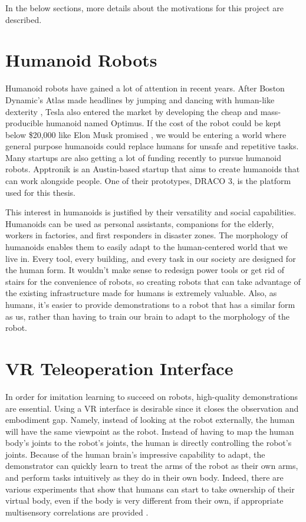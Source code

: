 In the below sections, more details about the motivations for this project are described.

\section{Humanoid Robots}
Humanoid robots have gained a lot of attention in recent years. After Boston Dynamic's Atlas made headlines by jumping and dancing with human-like dexterity \cite{atlas}, Tesla also entered the market by developing the cheap and mass-producible humanoid named Optimus. If the cost of the robot could be kept below \$20,000 like Elon Musk promised \cite{teslabot}, we would be entering a world where general purpose humanoids could replace humans for unsafe and repetitive tasks. Many startups are also getting a lot of funding recently to pursue humanoid robots. Apptronik is an Austin-based startup that aims to create humanoids that can work alongside people. One of their prototypes, DRACO 3, is the platform used for this thesis.

This interest in humanoids is justified by their versatility and social capabilities. Humanoids can be used as personal assistants, companions for the elderly, workers in factories, and first responders in disaster zones. The morphology of humanoids enables them to easily adapt to the human-centered world that we live in. Every tool, every building, and every task in our society are designed for the human form. It wouldn't make sense to redesign power tools or get rid of stairs for the convenience of robots, so creating robots that can take advantage of the existing infrastructure made for humans is extremely valuable. Also, as humans, it's easier to provide demonstrations to a robot that has a similar form as us, rather than having to train our brain to adapt to the morphology of the robot.

\section {VR Teleoperation Interface}
In order for imitation learning to succeed on robots, high-quality demonstrations are essential. Using a VR interface is desirable since it closes the observation and embodiment gap. Namely, instead of looking at the robot externally, the human will have the same viewpoint as the robot. Instead of having to map the human body's joints to the robot's joints, the human is directly controlling the robot's joints. Because of the human brain's impressive capability to adapt, the demonstrator can quickly learn to treat the arms of the robot as their own arms, and perform tasks intuitively as they do in their own body. Indeed, there are various experiments that show that humans can start to take ownership of their virtual body, even if the body is very different from their own, if appropriate multisensory correlations are provided \cite{10.3389/fnhum.2015.00141} \cite{10.3389/neuro.09.006.2008}. 

